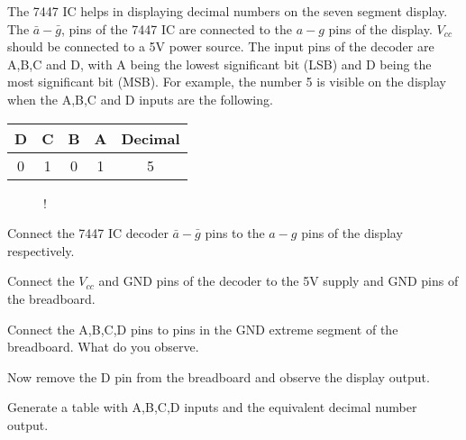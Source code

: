 %
%
%
The 7447 IC helps in displaying decimal numbers on the seven segment display.  The $\bar{a}-\bar{g}$, pins of the 7447 IC are connected to the $a-g$ pins of the display. $V_{cc}$ should be connected to a 5V power source. The input pins of the decoder are A,B,C and D, with A being the lowest significant bit (LSB) and D being the most significant bit (MSB).  For example, the number 5 is visible on the display when the A,B,C and D inputs are the following.
\begin{center}
	\begin{tabular}{|c|c|c|c|c|}
\hline
D & C & B & A & Decimal
\\ \hline
0 & 1 & 0 & 1 & 5
\\
\hline
\end{tabular}
\end{center}

%
\begin{figure}[!h]
\begin{center}
\resizebox {\columnwidth} {!} {

}
\end{center}
\caption{}
\label{fig:7447}
\end{figure}
%



%
\begin{problem}
	Connect the 7447 IC decoder $\bar{a}-\bar{g}$ pins to the $a-g$ pins of the display respectively.
\end{problem}
\begin{problem}
	Connect the $V_{cc}$ and GND pins of the decoder to the 5V supply and GND pins of the breadboard.
\end{problem}
\begin{problem}
	Connect the A,B,C,D pins to pins in the GND extreme segment of the breadboard.  What do you observe.
\end{problem}
\begin{problem}
	Now remove the D pin from the breadboard and observe the display output.
\end{problem}
\begin{problem}
	Generate a table with A,B,C,D inputs and the equivalent decimal number output.
\end{problem}
